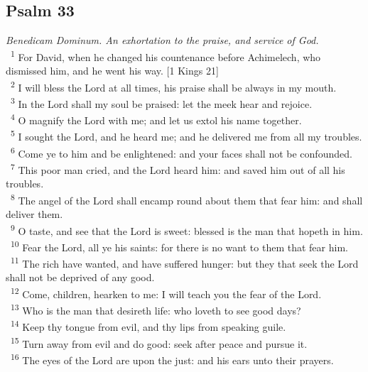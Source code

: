 \documentclass[a5paper,12pt]{article}
\begin{document}
\begin{multicols*}{2}
\section{Psalm 33}
\label{sec:orgd8ed8b6}
\emph{Benedicam Dominum. An exhortation to the praise, and service of God.}\\

~\textsuperscript{1} For David, when he changed his countenance before Achimelech, who dismissed him, and he went his way. [1 Kings 21]\\
~\textsuperscript{2} I will bless the Lord at all times, his praise shall be always in my mouth.\\
~\textsuperscript{3} In the Lord shall my soul be praised: let the meek hear and rejoice.\\
~\textsuperscript{4} O magnify the Lord with me; and let us extol his name together.\\
~\textsuperscript{5} I sought the Lord, and he heard me; and he delivered me from all my troubles.\\
~\textsuperscript{6} Come ye to him and be enlightened: and your faces shall not be confounded.\\
~\textsuperscript{7} This poor man cried, and the Lord heard him: and saved him out of all his troubles.\\
~\textsuperscript{8} The angel of the Lord shall encamp round about them that fear him: and shall deliver them.\\
~\textsuperscript{9} O taste, and see that the Lord is sweet: blessed is the man that hopeth in him.\\
~\textsuperscript{10} Fear the Lord, all ye his saints: for there is no want to them that fear him.\\
~\textsuperscript{11} The rich have wanted, and have suffered hunger: but they that seek the Lord shall not be deprived of any good.\\
~\textsuperscript{12} Come, children, hearken to me: I will teach you the fear of the Lord.\\
~\textsuperscript{13} Who is the man that desireth life: who loveth to see good days?\\
~\textsuperscript{14} Keep thy tongue from evil, and thy lips from speaking guile.\\
~\textsuperscript{15} Turn away from evil and do good: seek after peace and pursue it.\\
~\textsuperscript{16} The eyes of the Lord are upon the just: and his ears unto their prayers.\\

\end{multicols*}
\end{document}

